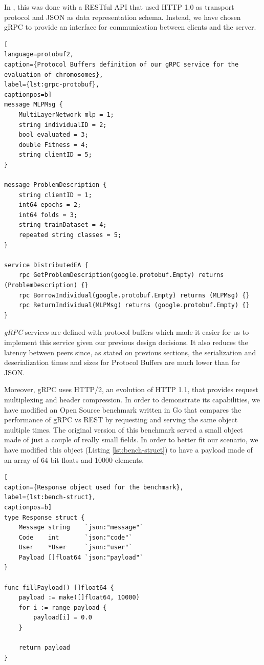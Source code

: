 In \cite{paper-pool-jj}, this was done with a RESTful API that used HTTP 1.0 as transport protocol and JSON as data representation schema. Instead, we have chosen gRPC \cite{grpc} to provide an interface for communication between clients and the server.

\begin{lstlisting}[
language=protobuf2,
caption={Protocol Buffers definition of our gRPC service for the evaluation of chromosomes},
label={lst:grpc-protobuf},
captionpos=b]
message MLPMsg {
    MultiLayerNetwork mlp = 1;
    string individualID = 2;
    bool evaluated = 3;
    double Fitness = 4;
    string clientID = 5;
}

message ProblemDescription {
    string clientID = 1;
    int64 epochs = 2;
    int64 folds = 3;
    string trainDataset = 4;
    repeated string classes = 5;
}

service DistributedEA {
    rpc GetProblemDescription(google.protobuf.Empty) returns (ProblemDescription) {}
    rpc BorrowIndividual(google.protobuf.Empty) returns (MLPMsg) {}
    rpc ReturnIndividual(MLPMsg) returns (google.protobuf.Empty) {}
}
\end{lstlisting}

\textit{gRPC} services are defined with protocol buffers which made it easier for us to implement this service given our previous design decisions. It also reduces the latency between peers since, as stated on previous sections, the serialization and deserialization times and sizes for Protocol Buffers are much lower than for JSON.

Moreover, gRPC uses HTTP/2, an evolution of HTTP 1.1, that provides request multiplexing and header compression. In order to demonstrate its capabilities, we have modified an Open Source benchmark \cite{rest-vs-grpc-bench} written in Go that compares the performance of gRPC vs REST by requesting and serving the same object multiple times. The original version of this benchmark served a small object made of just a couple of really small fields. In order to better fit our scenario, we have modified this object (Listing \ref{lst:bench-struct}) to have a payload made of an array of 64 bit floats and 10000 elements.

\begin{lstlisting}[
caption={Response object used for the benchmark},
label={lst:bench-struct},
captionpos=b]
type Response struct {
	Message string    `json:"message"`
	Code    int       `json:"code"`
	User    *User     `json:"user"`
	Payload []float64 `json:"payload"`
}

func fillPayload() []float64 {
	payload := make([]float64, 10000)
	for i := range payload {
		payload[i] = 0.0
	}

	return payload
}
\end{lstlisting}

